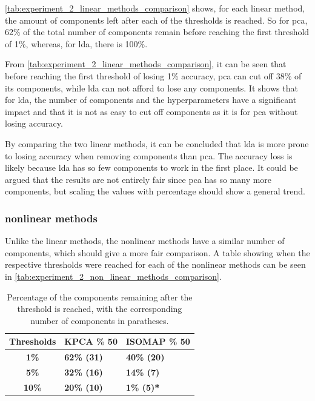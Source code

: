 \autoref{tab:experiment_2_linear_methods_comparison} shows, for each linear method, the amount of components left after each of the thresholds is reached. So for \gls{pca}, 62\% of the total number of components remain before reaching the first threshold of 1\%, whereas, for \gls{lda}, there is 100\%.

From \autoref{tab:experiment_2_linear_methods_comparison}, it can be seen that before reaching the first threshold of losing 1\% accuracy, \gls{pca} can cut off 38\% of its components, while \gls{lda} can not afford to lose any components. It shows that for \gls{lda}, the number of components and the hyperparameters have a significant impact and that it is not as easy to cut off components as it is for \gls{pca} without losing accuracy.

By comparing the two linear methods, it can be concluded that \gls{lda} is more prone to losing accuracy when removing components than \gls{pca}. The accuracy loss is likely because \gls{lda} has so few components to work in the first place. It could be argued that the results are not entirely fair since \gls{pca} has so many more components, but scaling the values with percentage should show a general trend.


\subsubsection{nonlinear methods}
Unlike the linear methods, the nonlinear methods have a similar number of components, which should give a more fair comparison. A table showing when the respective thresholds were reached for each of the nonlinear methods can be seen in \autoref{tab:experiment_2_non_linear_methods_comparison}.

\begin{table}[htb!]
    \centering
    \begin{tabular}{cp{}p{}}
        \toprule
        \textbf{Thresholds} & \textbf{KPCA \% 50} & \textbf{ISOMAP \% 50} \\
        \midrule
        \textbf{1\%} & \textbf{62\% (31)} & \textbf{40\% (20)} \\
        \textbf{5\%} & \textbf{32\% (16)} & \textbf{14\% (7)} \\ 
        \textbf{10\%} & \textbf{20\% (10)} & \textbf{1\% (5)*} \\
        \bottomrule
    \end{tabular}
    \caption{Percentage of the components remaining after the threshold is reached, with the corresponding number of components in paratheses.}
    \label{tab:experiment_2_non_linear_methods_comparison}
\end{table}

